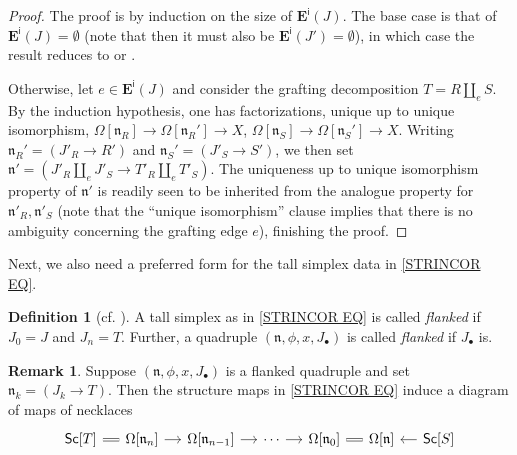 \documentclass[a4paper,10pt]{article}%
\numberwithin{equation}{section}
\numberwithin{figure}{section}
\theoremstyle{definition} %
\newtheorem{definition}[equation]{Definition}%
\newtheorem{remark}[equation]{Remark}%
\begin{document}
\begin{proof}
	The proof is by induction on the size of 
	$\boldsymbol{E}^{\mathsf{i}}(J)$.
	The base case is that of $\boldsymbol{E}^{\mathsf{i}}(J) = \emptyset$
	(note that then it must also be $\boldsymbol{E}^{\mathsf{i}}(J') = \emptyset$),
	in which case the result reduces to 
	\cite[Prop. 6.9]{CM11} or
	\cite[Prop. 5.62]{Per18}.

	Otherwise, let $e \in \boldsymbol{E}^{\mathsf{i}}(J)$
	and consider the grafting decomposition
	$T = R \amalg_e S$.
	By the induction hypothesis, 
	one has factorizations, unique up to unique isomorphism,
	$\Omega[\mathfrak{n}_{R}] \to \Omega[\mathfrak{n}_R'] \to X$,
	$\Omega[\mathfrak{n}_S] \to \Omega[\mathfrak{n}_{S}'] \to X$.
	Writing 
	$\mathfrak{n}_R' = (J'_R \to R')$
	and 
	$\mathfrak{n}_S' = (J'_S \to S')$,
	we then set
	$\mathfrak{n}'= \left(
	J'_R \amalg_e J'_S \to T'_R \amalg_e T'_S
	\right)$.
	The uniqueness up to unique isomorphism property of
	$\mathfrak{n}'$ is readily seen to be inherited from 
	the analogue property for 
	$\mathfrak{n}'_R,\mathfrak{n}'_S$
	(note that the ``unique isomorphism'' clause
	implies that there is no ambiguity concerning the grafting edge $e$),
	finishing the proof.
\end{proof}


Next, we also need a preferred form for the tall simplex data in \eqref{STRINCOR EQ}.


\begin{definition}[{cf. \cite[\S 4]{DS11}}]
        \label{FLANKED_DEF}
	A tall simplex as in 
	\eqref{STRINCOR EQ}
	is called \emph{flanked}
	if $J_0 = J$
	and $J_n = T$.
%	
	Further, a quadruple
	$(\mathfrak{n},\phi,x,J_{\bullet})$
	is called \emph{flanked} if $J_{\bullet}$ is.
\end{definition}



\begin{remark}
	Suppose $(\mathfrak{n},\phi,x,J_{\bullet})$
	is a flanked quadruple
	and set $\mathfrak{n}_k = (J_k \to T)$.
	Then the structure maps in \eqref{STRINCOR EQ}
	induce a diagram of maps of necklaces
\begin{equation}
\begin{tikzcd}[column sep=12pt]
	\mathsf{Sc}[T]
	\ar[equal]{r} 
&
	\Omega[\mathfrak{n}_n]
	\ar{r}
&
	\Omega[\mathfrak{n}_{n-1}]
	\ar{r}
&
	\cdots
	\ar{r}
&
	\Omega[\mathfrak{n}_0]
	\ar[equal]{r}
&
	\Omega[\mathfrak{n}]
&
	\mathsf{Sc}[S]
	\ar{l}
\end{tikzcd}
\end{equation} 
\end{remark}
\end{document}
